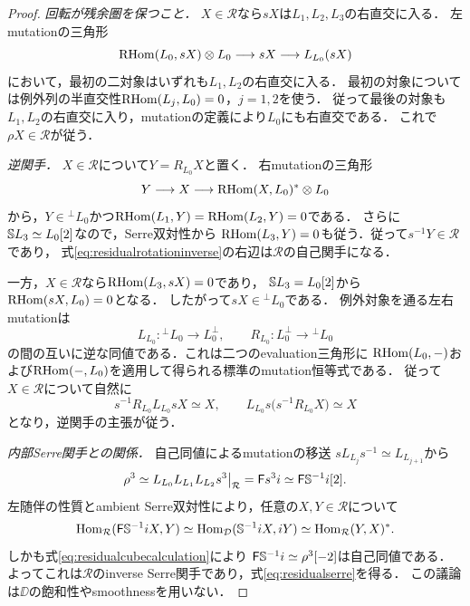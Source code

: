 \documentclass[11pt,a4paper]{ltjsarticle}
\begin{document}
\begin{proof}
\emph{回転が残余圏を保つこと．}
$X\in\mathcal R$なら$sX$は$L_1,L_2,L_3$の右直交に入る．
左mutationの三角形
\[
 \operatorname{RHom}(L_0,sX)\otimes L_0\longrightarrow sX
 \longrightarrow L_{L_0}(sX)
\]
において，最初の二対象はいずれも$L_1,L_2$の右直交に入る．
最初の対象については例外列の半直交性$\operatorname{RHom}(L_j,L_0)=0$，$j=1,2$を使う．
従って最後の対象も$L_1,L_2$の右直交に入り，mutationの定義により$L_0$にも右直交である．
これで$\rho X\in\mathcal R$が従う．

\emph{逆関手．}
$X\in\mathcal R$について$Y=R_{L_0}X$と置く．
右mutationの三角形
\[
 Y\longrightarrow X\longrightarrow\operatorname{RHom}(X,L_0)^*\otimes L_0
\]
から，$Y\in{}^\perp L_0$かつ$\operatorname{RHom}(L_1,Y)=\operatorname{RHom}(L_2,Y)=0$である．
さらに$\mathbb S L_3\simeq L_0[2]$なので，Serre双対性から
$\operatorname{RHom}(L_3,Y)=0$も従う．従って$s^{-1}Y\in\mathcal R$であり，
式\eqref{eq:residualrotationinverse}の右辺は$\mathcal R$の自己関手になる．

一方，$X\in\mathcal R$なら$\operatorname{RHom}(L_3,sX)=0$であり，
$\mathbb S L_3=L_0[2]$から$\operatorname{RHom}(sX,L_0)=0$となる．
したがって$sX\in{}^\perp L_0$である．
例外対象を通る左右mutationは
\[
 L_{L_0}:{}^\perp L_0\longrightarrow L_0^\perp,
 \qquad R_{L_0}:L_0^\perp\longrightarrow{}^\perp L_0
\]
の間の互いに逆な同値である．これは二つのevaluation三角形に
$\operatorname{RHom}(L_0,-)$および$\operatorname{RHom}(-,L_0)$を適用して得られる標準のmutation恒等式である．
従って$X\in\mathcal R$について自然に
\[
 s^{-1}R_{L_0}L_{L_0}sX\simeq X,
 \qquad L_{L_0}s\bigl(s^{-1}R_{L_0}X\bigr)\simeq X
\]
となり，逆関手の主張が従う．

\emph{内部Serre関手との関係．}
自己同値によるmutationの移送
$sL_{L_j}s^{-1}\simeq L_{L_{j+1}}$から
\begin{equation}\label{eq:residualcubecalculation}
 \rho^3\simeq L_{L_0}L_{L_1}L_{L_2}s^3\big|_{\mathcal R}
       =\mathsf F s^3i
       \simeq\mathsf F\mathbb S^{-1}i[2].
\end{equation}
左随伴の性質とambient Serre双対性により，任意の$X,Y\in\mathcal R$について
\[
 \operatorname{Hom}_{\mathcal R}(\mathsf F\mathbb S^{-1}iX,Y)
 \simeq\operatorname{Hom}_{\mathcal D}(\mathbb S^{-1}iX,iY)
 \simeq\operatorname{Hom}_{\mathcal R}(Y,X)^*.
\]
しかも式\eqref{eq:residualcubecalculation}により
$\mathsf F\mathbb S^{-1}i\simeq\rho^3[-2]$は自己同値である．
よってこれは$\mathcal R$のinverse Serre関手であり，式\eqref{eq:residualserre}を得る．
この議論は$\DD$の飽和性やsmoothnessを用いない．


\end{proof}
\end{document}
